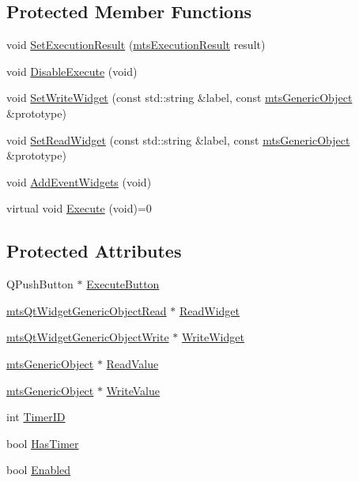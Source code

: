 \subsection*{Protected Member Functions}
\begin{DoxyCompactItemize}
\item 
void \hyperlink{classmts_qt_widget_function_a601e9e96839fe89f35a73b0740bd7758}{Set\-Execution\-Result} (\hyperlink{classmts_execution_result}{mts\-Execution\-Result} result)
\item 
void \hyperlink{classmts_qt_widget_function_af7d8ef8071db0595820c6b3646b49d42}{Disable\-Execute} (void)
\item 
void \hyperlink{classmts_qt_widget_function_af41703d3e97486e4ea35b05d831d6168}{Set\-Write\-Widget} (const std\-::string \&label, const \hyperlink{classmts_generic_object}{mts\-Generic\-Object} \&prototype)
\item 
void \hyperlink{classmts_qt_widget_function_a30a3d1b87ecc5594a486ee1cc91023e8}{Set\-Read\-Widget} (const std\-::string \&label, const \hyperlink{classmts_generic_object}{mts\-Generic\-Object} \&prototype)
\item 
void \hyperlink{classmts_qt_widget_function_a302ae69b493245debfcb097bd1f5170e}{Add\-Event\-Widgets} (void)
\item 
virtual void \hyperlink{classmts_qt_widget_function_a2cc4ca75284e81bee8709a70c7b4a231}{Execute} (void)=0
\end{DoxyCompactItemize}
\subsection*{Protected Attributes}
\begin{DoxyCompactItemize}
\item 
Q\-Push\-Button $\ast$ \hyperlink{classmts_qt_widget_function_ade106b082a43dd9521e2d337d6eaed4d}{Execute\-Button}
\item 
\hyperlink{classmts_qt_widget_generic_object_read}{mts\-Qt\-Widget\-Generic\-Object\-Read} $\ast$ \hyperlink{classmts_qt_widget_function_a333d0068c3806b9f53ce88c951b5269b}{Read\-Widget}
\item 
\hyperlink{classmts_qt_widget_generic_object_write}{mts\-Qt\-Widget\-Generic\-Object\-Write} $\ast$ \hyperlink{classmts_qt_widget_function_a4601b0dcc1cdf04274dd9d924e5b49c5}{Write\-Widget}
\item 
\hyperlink{classmts_generic_object}{mts\-Generic\-Object} $\ast$ \hyperlink{classmts_qt_widget_function_a8aaeaa7548a0418ec88d948e01155403}{Read\-Value}
\item 
\hyperlink{classmts_generic_object}{mts\-Generic\-Object} $\ast$ \hyperlink{classmts_qt_widget_function_a0e56b1cd0270cbbbb914602ace6f1586}{Write\-Value}
\item 
int \hyperlink{classmts_qt_widget_function_a9d0fde621a8e282ed207854d6f772a7d}{Timer\-I\-D}
\item 
bool \hyperlink{classmts_qt_widget_function_a0dd74f0d0cec1225c98c06c8ee231b12}{Has\-Timer}
\item 
bool \hyperlink{classmts_qt_widget_function_af20ae57edf9ba7c3404b00eb3fcee728}{Enabled}
\end{DoxyCompactItemize}


